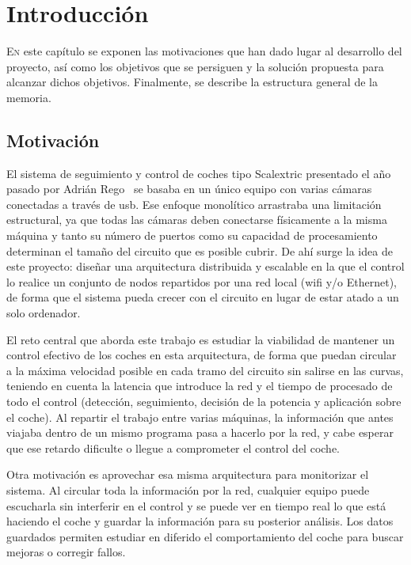 \chapter{Introducción}
\label{chap:introducion}

\lettrine{E}{n} este capítulo se exponen las motivaciones que han dado lugar al desarrollo del proyecto, así como los objetivos %
que se persiguen y la solución propuesta para alcanzar dichos objetivos. Finalmente, se describe la estructura general de la memoria.%

\section{Motivación}
\label{sec:motivacion}

El sistema de seguimiento y control de coches tipo Scalextric presentado el año pasado por Adrián Rego~\cite{tfgadrian} se basaba en un único equipo con varias cámaras conectadas a través de \gls{usb}. Ese enfoque monolítico arrastraba una limitación estructural, ya que todas las cámaras deben conectarse físicamente a la misma máquina y tanto su número de puertos como su capacidad de procesamiento determinan el tamaño del circuito que es posible cubrir. 
De ahí surge la idea de este proyecto: %
diseñar una arquitectura distribuida y escalable en la que el control lo realice un conjunto de nodos repartidos por una red local (wifi y/o Ethernet), de forma que el sistema pueda crecer con el circuito en lugar de estar atado a un solo ordenador.

El reto central que aborda este trabajo es estudiar la viabilidad de mantener un control efectivo de los coches en esta arquitectura, de forma que puedan circular a la máxima velocidad posible en cada tramo del circuito sin salirse en las curvas, teniendo en cuenta la latencia que introduce la red y el tiempo de procesado de todo el control (detección, seguimiento, decisión de la potencia y aplicación sobre el coche). Al repartir el trabajo entre varias máquinas, la información que antes viajaba dentro de un mismo programa pasa a hacerlo por la red, y cabe esperar que ese retardo dificulte o llegue a comprometer el control del coche.

Otra motivación es aprovechar esa misma arquitectura para monitorizar el sistema. Al circular toda la información por la red, cualquier equipo puede escucharla sin interferir en el control y se puede ver en tiempo real lo que está haciendo el coche y guardar la información para su posterior análisis. 
Los datos guardados permiten estudiar en diferido el comportamiento del coche para buscar mejoras o corregir fallos. %

